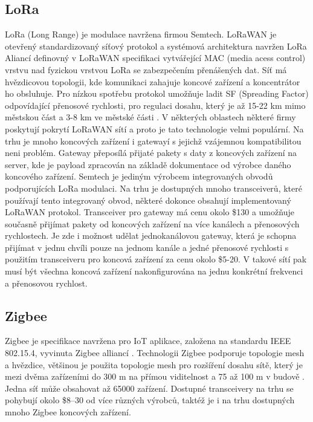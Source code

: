 \subsection{LoRa}
LoRa (Long Range) je modulace navržena firmou Semtech.
LoRaWAN je otevřený standardizovaný síťový protokol a systémová architektura navržen LoRa Aliancí definovný v LoRaWAN specifikaci \cite{lorawan_specification} vytvářející MAC (media acess control) vrstvu nad fyzickou vrstvou LoRa se zabezpečením přenášených dat. 
Síť má hvězdicovou topologii, kde komunikaci zahajuje koncové zařízení a koncentrátor ho obsluhuje.
Pro nízkou spotřebu protokol umožňuje ladit SF (Spreading Factor) odpovídající přenosové rychlosti, pro regulaci dosahu, který je až 15-22 km mimo městskou část a 3-8 km ve městské části \cite{lorawan_specification}.
V některých oblastech některé firmy poskytují pokrytí LoRaWAN sítí a proto je tato technologie velmi populární. Na trhu je mnoho koncových zařízení i gatewayí s jejichž vzájemnou kompatibilitou neni problém. Gateway přeposílá přijaté pakety s daty z koncových zařízení na server, kde je payload zpracován na základě dokumentace od výrobce daného koncového zařízení.
Semtech je jediným výrobcem integrovaných obvodů podporujících LoRa modulaci. Na trhu je dostupných mnoho transceiverů, které používají tento integrovaný obvod, některé dokonce obsahují implementovaný LoRaWAN protokol.
Transceiver pro gateway má cenu okolo \$130 a umožňuje současně přijímat pakety od koncových zařízení na více kanálech a přenosových rychlostech. Je zde i možnost udělat jednokanálovou gateway, která je schopna přijímat v jednu chvíli pouze na jednom kanále a jedné přenosové rychlosti s použitím transceiveru pro koncová zařízení za cenu okolo \$5-20. V takové sítí pak musí být všechna koncová zařízení nakonfigurována na jednu konkrétní frekvenci a přenosovou rychlost.



\subsection{Zigbee}
Zigbee je specifikace navržena pro IoT aplikace, založena na standardu  IEEE 802.15.4, vyvinuta Zigbee alliancí \cite{Zigbee_alliance_about}.
Technologii Zigbee podporuje topologie mesh a hvězdice, většinou je použita topologie mesh pro rozšíření dosahu sítě, který je mezi dvěma zařízeními do 300 m na přímou viditelnost a 75 až 100 m v budově \cite{Zigbee_alliance_solution}. Jedna síť může obsahovat až 65000 zařízení.
Dostupné transceivery na trhu se pohybují okolo \$8–30 od více různých výrobců, taktéž je i na trhu dostupných mnoho Zigbee koncových zařízení.



